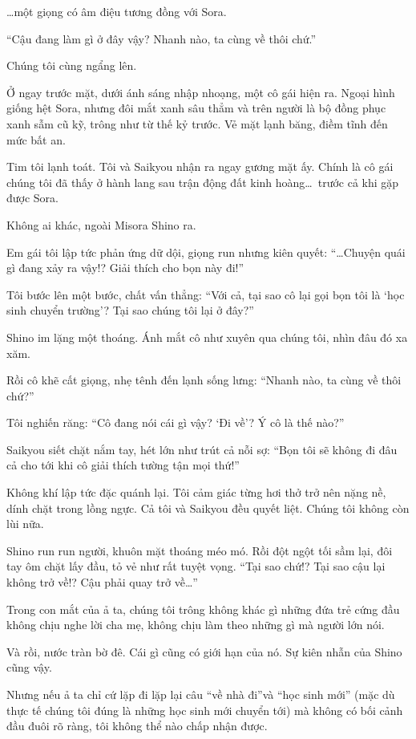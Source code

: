 \documentclass[../main.tex]{subfiles}
\begin{document}
\dots một giọng có âm điệu tương đồng với Sora.

``Cậu đang làm gì ở đây vậy? Nhanh nào, ta cùng về thôi chứ.''

Chúng tôi cùng ngẩng lên.

Ở ngay trước mặt, dưới ánh sáng nhập nhoạng, một cô gái hiện ra. Ngoại hình giống hệt Sora, nhưng đôi mắt xanh sâu thẳm và trên người là bộ đồng phục xanh sẫm cũ kỹ, trông như từ thế kỷ trước. Vẻ mặt lạnh băng, điềm tĩnh đến mức bất an.

Tim tôi lạnh toát. Tôi và Saikyou nhận ra ngay gương mặt ấy. Chính là cô gái chúng tôi đã thấy ở hành lang sau trận động đất kinh hoàng\dots\ trước cả khi gặp được Sora.

Không ai khác, ngoài Misora Shino ra.

Em gái tôi lập tức phản ứng dữ dội, giọng run nhưng kiên quyết: ``\dots Chuyện quái gì đang xảy ra vậy!? Giải thích cho bọn này đi!''

Tôi bước lên một bước, chất vấn thẳng: ``Với cả, tại sao cô lại gọi bọn tôi là `học sinh chuyển trường'? Tại sao chúng tôi lại ở đây?''

Shino im lặng một thoáng. Ánh mắt cô như xuyên qua chúng tôi, nhìn đâu đó xa xăm.

Rồi cô khẽ cất giọng, nhẹ tênh đến lạnh sống lưng: ``Nhanh nào, ta cùng về thôi chứ?''

Tôi nghiến răng: ``Cô đang nói cái gì vậy? `Đi về'? Ý cô là thế nào?''

Saikyou siết chặt nắm tay, hét lớn như trút cả nỗi sợ: ``Bọn tôi sẽ không đi đâu cả cho tới khi cô giải thích tường tận mọi thứ!''

Không khí lập tức đặc quánh lại. Tôi cảm giác từng hơi thở trở nên nặng nề, dính chặt trong lồng ngực. Cả tôi và Saikyou đều quyết liệt. Chúng tôi không còn lùi nữa.

Shino run run người, khuôn mặt thoáng méo mó. Rồi đột ngột tối sầm lại, đôi tay ôm chặt lấy đầu, tỏ vẻ như rất tuyệt vọng. ``Tại sao chứ!? Tại sao cậu lại không trở về!? Cậu phải quay trở về\dots''

Trong con mắt của ả ta, chúng tôi trông không khác gì những đứa trẻ cứng đầu không chịu nghe lời cha mẹ, không chịu làm theo những gì mà người lớn nói.

Và rồi, nước tràn bờ đê. Cái gì cũng có giới hạn của nó. Sự kiên nhẫn của Shino cũng vậy.

Nhưng nếu ả ta chỉ cứ lặp đi lặp lại câu ``về nhà đi''và ``học sinh mới'' (mặc dù thực tế chúng tôi đúng là những học sinh mới chuyển tới) mà không có bối cảnh đầu đuôi rõ ràng, tôi không thể nào chấp nhận được.
\end{document}
